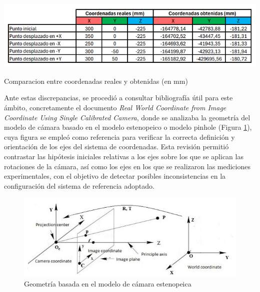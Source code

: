   \begin{table}[H]
     \centering
     \begin{center}
       \includegraphics[width=140mm]{figs/Primer resultados postit.png}
     \end{center}
     \caption{Comparacion entre coordenadas reales y obtenidas (en mm)}
    \label{tab:primera_estimacion_postit}
  \end{table}

Ante estas discrepancias, se procedió a consultar bibliografía útil para este ámbito, concretamente el documento \textit{Real World Coordinate from Image Coordinate Using Single Calibrated Camera}\cite{Joko13}, donde se analizaba la geometría del modelo de cámara basado en el modelo estenopeico o modelo pinhole (Figura \ref{fig:geometria_modelopinhole}), cuya figura se empleó como referencia para verificar la correcta definición y orientación de los ejes del sistema de coordenadas. Esta revisión permitió contrastar las hipótesis iniciales relativas a los ejes sobre los que se aplican las rotaciones de la cámara, así como los ejes en los que se realizaron las mediciones experimentales, con el objetivo de detectar posibles inconsistencias en la configuración del sistema de referencia adoptado.

  \begin{figure}[H]
     \centering
     \begin{center}
       \includegraphics[width=135mm]{figs/Geometría del modelo de cámara basado en el modelo de cámara estenopeica.jpeg}
     \end{center}
     \caption{Geometría basada en el modelo de cámara estenopeica}
    \label{fig:geometria_modelopinhole}
  \end{figure}

